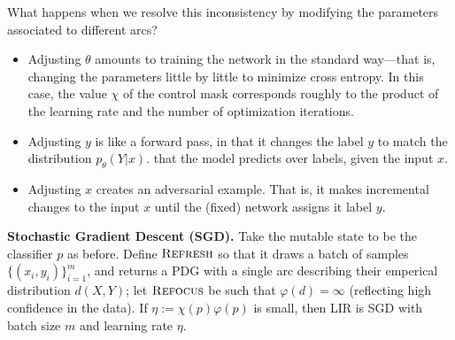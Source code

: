 What happens when we resolve this inconsistency
by modifying the parameters associated to different arcs?

\begin{itemize}
    \item Adjusting $\theta$
    amounts to training the network in the standard way---that is, changing the parameters little by little to minimize cross entropy.
    In this case, the value $\chi$ of the control mask corresponds roughly
    to the product of the learning rate and the number of optimization iterations.

    \item Adjusting $y$
    is like a  forward pass, in that it changes the label $y$ to match the distribution $p_\theta(Y|x)$.
    that the model predicts over labels, given the input $x$. 

    \item Adjusting $x$
    creates an adversarial example.
    That is, it makes incremental changes to the input $x$
        until the (fixed) network assigns it label $y$.
\end{itemize}

\textbf{Stochastic Gradient Descent (SGD).} \label{sec:SGD}
Take the mutable state to be the classifier $p$ as before.
Define $\textsc{Refresh}$ so that it draws a batch of samples $\{(x_i,y_i)\}_{i=1}^m$,
and returns a PDG with a single arc describing their emperical distribution $d(X,Y)$;
let $\textsc{Refocus}$ be such that $\varphi(d) = \infty$
    (reflecting high confidence in the data).
If $\eta := \chi(p) \varphi(p)$ is small, then
    LIR is SGD with batch size $m$ and learning rate $\eta$.


